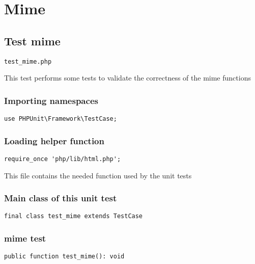 \documentclass[a4paper]{article}
\begin{document}
\section{Mime}

\hypertarget{toc302}{}
\subsection{Test mime}

\begin{lstlisting}
test_mime.php
\end{lstlisting}

This test performs some tests to validate the correctness
of the mime functions

\hypertarget{toc303}{}
\subsubsection{Importing namespaces}

\begin{lstlisting}
use PHPUnit\Framework\TestCase;
\end{lstlisting}

\hypertarget{toc304}{}
\subsubsection{Loading helper function}

\begin{lstlisting}
require_once 'php/lib/html.php';
\end{lstlisting}

This file contains the needed function used by the unit tests

\hypertarget{toc305}{}
\subsubsection{Main class of this unit test}

\begin{lstlisting}
final class test_mime extends TestCase
\end{lstlisting}

\hypertarget{toc306}{}
\subsubsection{mime test}

\begin{lstlisting}
public function test_mime(): void
\end{lstlisting}
\end{document}
